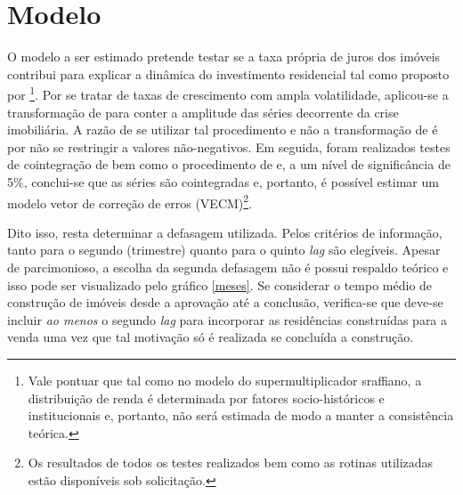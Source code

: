 \section{Modelo}
\label{Modelo_empirico}

O modelo a ser estimado pretende testar se a taxa própria de juros dos imóveis contribui para explicar a dinâmica do investimento residencial tal como proposto por \textcite{teixeira_crescimento_2015}\footnote{Vale pontuar que tal como no modelo do supermultiplicador sraffiano, a distribuição de renda é determinada por fatores socio-históricos e institucionais e, portanto, não será estimada de modo a manter a consistência teórica.}. Por se tratar de taxas de crescimento com ampla volatilidade, aplicou-se a transformação de \textcite{yeo_new_2000} para conter a amplitude das séries decorrente da crise imobiliária. A razão de se utilizar tal procedimento e não a transformação de \textcite{box_analysis_1964} é por não se restringir a valores não-negativos. Em seguida, foram realizados testes de cointegração de \textcite{engle_co-integration_1987} bem como o procedimento de \textcite{johansen_estimation_1991} e, a um nível de significância de 5\%, conclui-se que as séries são cointegradas e, portanto, é possível estimar um modelo vetor de correção de erros (VECM)\footnote{Os resultados de todos os testes realizados bem como as rotinas utilizadas estão disponíveis sob solicitação.}.

Dito isso, resta determinar a defasagem utilizada. Pelos critérios de informação, tanto para o segundo (trimestre) quanto para o quinto \textit{lag} são elegíveis. Apesar de parcimonioso, a escolha da segunda defasagem não é possui respaldo teórico e isso pode ser visualizado pelo gráfico \ref{meses}. Se considerar o tempo médio de construção de imóveis desde a aprovação até a conclusão, verifica-se que deve-se incluir \textit{ao menos} o segundo \textit{lag} para incorporar as residências construídas para a venda uma vez que tal motivação só é realizada se concluída a construção. 


